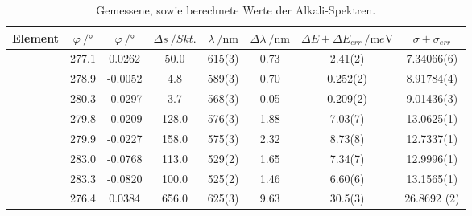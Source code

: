 \begin{table}
\centering
\begin{tabular}{S  S[table-format=3.1] S[table-format=1.4] S[table-format=3.1] S[table-format=1.0(1)] S[table-format=1.0] S[table-format=1.3(1)] S[table-format=1.5(1)] }
\toprule
{Element} & {$\varphi\:/\si\degree$} & {$\varphi\:/\si\degree$} & {$\Delta{s}\:/Skt.$}& {$\lambda\:/\si{\nano\meter}$} & {$\Delta{\lambda}\:/\si{\nano\meter}$}&{$\Delta{E}\pm\Delta{E_{err}}\:/\si{\milli}e\si\volt$}&{$\sigma\pm\sigma_{err}$}\\
\midrule
{}  & 277.1 &  0.0262 &  50.0 & 615(3) & 0.73 &  2.41(2)    &   7.34066(6)  \\
           & 278.9 & -0.0052 &   4.8 & 589(3) & 0.70 &  0.252(2)   &   8.91784(4)  \\
           & 280.3 & -0.0297 &   3.7 & 568(3) & 0.05 &  0.209(2)   &   9.01436(3)  \\
  & 279.8 & -0.0209 & 128.0 & 576(3) & 1.88 &  7.03(7)    &  13.0625(1)    \\
           & 279.9 & -0.0227 & 158.0 & 575(3) & 2.32 &  8.73(8)    &  12.7337(1)  \\
           & 283.0 & -0.0768 & 113.0 & 529(2) & 1.65 &  7.34(7)    &  12.9996(1)  \\
           & 283.3 & -0.0820 & 100.0 & 525(2) & 1.46 &  6.60(6)    &  13.1565(1)    \\
  & 276.4 &  0.0384 & 656.0 & 625(3) & 9.63 & 30.5(3)     &  26.8692 (2)   \\
\bottomrule
\end{tabular}
\caption{Gemessene, sowie berechnete Werte der Alkali-Spektren.}
\label{tab:spektren}
\end{table}


